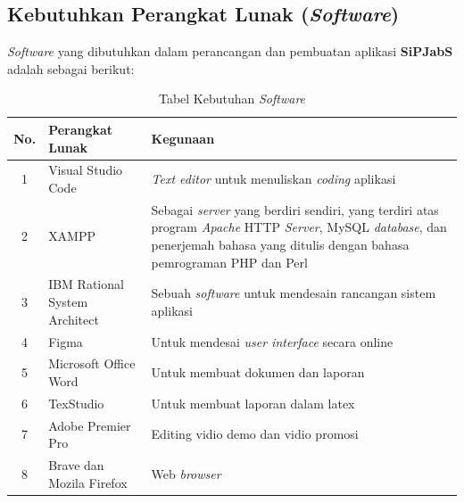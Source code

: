 \newpage
\subsection{Kebutuhkan Perangkat Lunak (\textit{Software})}

\textit{Software} yang dibutuhkan dalam perancangan dan pembuatan aplikasi \textbf{SiPJabS}
adalah sebagai berikut:

\begin{table}[H]
	\centering
	\caption{Tabel Kebutuhan \textit{Software}}
	\begin{tabular}{ | c | l | p{64.5mm} | }
		\hline
		No. & Perangkat Lunak & Kegunaan \\
		\hline
		
		1 & Visual Studio Code & \textit{Text editor} untuk menuliskan \textit{coding} aplikasi \\
				
		\hline
		
		2 & XAMPP & Sebagai \textit{server} yang berdiri sendiri, yang terdiri atas program \textit{Apache} HTTP \textit{Server}, MySQL \textit{database}, dan penerjemah bahasa yang ditulis dengan bahasa pemrograman PHP dan Perl \\
		
		\hline
		
		3 & IBM Rational System Architect  & Sebuah \textit{software} untuk mendesain rancangan sistem aplikasi \\
		
		\hline
		
		4 & Figma & Untuk mendesai \textit{user interface} secara online \\
		
		
		\hline
		
		5 & Microsoft Office Word & Untuk membuat dokumen dan laporan \\
		
		\hline
		
		6 & TexStudio & Untuk membuat laporan dalam latex \\
		
		\hline
		
		7 & Adobe Premier Pro & Editing vidio demo dan vidio promosi \\
		
		\hline
		
		8 & Brave dan Mozila Firefox & Web \textit{browser} \\
		
		\hline
	\end{tabular}
\end{table}


